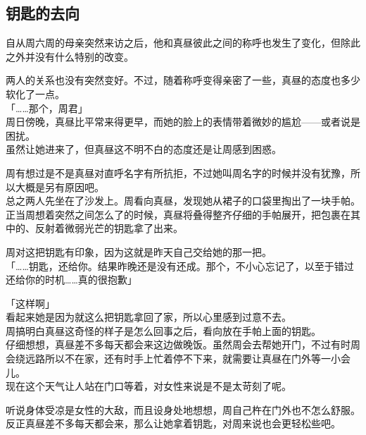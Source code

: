 \subsection{钥匙的去向}

自从周六周的母亲突然来访之后，他和真昼彼此之间的称呼也发生了变化，但除此之外并没有什么特别的改变。

两人的关系也没有突然变好。不过，随着称呼变得亲密了一些，真昼的态度也多少软化了一点。\\

「……那个，周君」\\

周日傍晚，真昼比平常来得更早，而她的脸上的表情带着微妙的尴尬——或者说是困扰。\\

虽然让她进来了，但真昼这不明不白的态度还是让周感到困惑。

周有想过是不是真昼对直呼名字有所抗拒，不过她叫周名字的时候并没有犹豫，所以大概是另有原因吧。\\

总之两人先坐在了沙发上。周看向真昼，发现她从裙子的口袋里掏出了一块手帕。\\

正当周想着突然之间怎么了的时候，真昼将叠得整齐仔细的手帕展开，把包裹在其中的、反射着微弱光芒的钥匙拿了出来。

周对这把钥匙有印象，因为这就是昨天自己交给她的那一把。\\

「……钥匙，还给你。结果昨晚还是没有还成。那个，不小心忘记了，以至于错过还给你的时机……真的很抱歉」

「这样啊」\\

看起来她是因为就这么把钥匙拿回了家，所以心里感到过意不去。\\

周搞明白真昼这奇怪的样子是怎么回事之后，看向放在手帕上面的钥匙。\\

仔细想想，真昼差不多每天都会来这边做晚饭。虽然周会去帮她开门，不过有时周会绕远路所以不在家，还有时手上忙着停不下来，就需要让真昼在门外等一小会儿。\\

现在这个天气让人站在门口等着，对女性来说是不是太苛刻了呢。

听说身体受凉是女性的大敌，而且设身处地想想，周自己杵在门外也不怎么舒服。\\

反正真昼差不多每天都会来，那么让她拿着钥匙，对周来说也会更轻松些吧。\\

